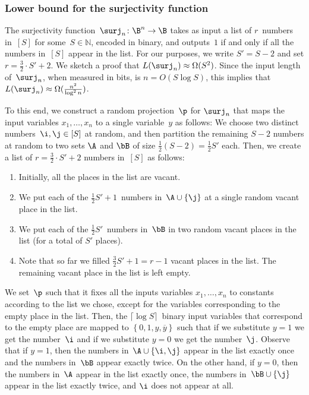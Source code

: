 \documentclass[11pt]{article}
\numberwithin{equation}{section}
\theoremstyle{definition}
\theoremstyle{plain}
\newcommand{\N}{\mathbb N}
\theoremstyle{definition}\newtheorem{notation}[theorem]{Notation}\theoremstyle{plain}
\begin{document}
\subsubsection{Lower bound for the surjectivity function}

The surjectivity function~$\surj_{n}\colon\B^{n}\to\B$ \cite{BM12} takes
as input a list of $r$~numbers in~$\left[S\right]$ for some~$S\in\N$,
encoded in binary, and outputs~$1$ if and only if all the numbers
in~$\left[S\right]$ appear in the list. For our purposes, we 
%
write %
$S'=S-2$ and set $r=\frac{3}{2}\cdot S'+2$. We sketch a proof that
$L(\surj_{n})\approx\Omega(S^{2})$. Since the input length of~$\surj_{n}$,
%
when measured in bits, is $n=O(S\log S)$, this implies that $L(\surj_{n})\approx\Omega(\frac{n^{2}}{\log^{2}n})$.

To this end, we construct a random projection~$\p$ for $\surj_{n}$
that maps the input variables $x_{1},\ldots,x_{n}$ to a single variable~$y$
as follows: We choose two distinct numbers~$\i,\j\in\left[S\right]$ at random,
and then partition the remaining $S-2$ numbers at random to two sets
$\A$ and $\bB$ of size $\frac{1}{2}(S-2)=\frac{1}{2}S'$ each. Then,
we create a list of $r=\frac{3}{2}\cdot S'+2$ numbers in~$\left[S\right]$
as follows:
\begin{enumerate}
\item Initially, all the places in the list are vacant.

\item We put each of the $\frac{1}{2}S'+1$~numbers in~$\A\cup\left\{ \j\right\} $
at a single random vacant place in the list.
\item We put each of the $\frac{1}{2}S'$~numbers in~$\bB$ in two random vacant
places in the list (for a total of $S'$ places).
\item Note that so far we filled $\frac{3}{2}S'+1=r-1$ vacant places in the list.
The remaining vacant place in the list is left empty.
\end{enumerate}
We set~$\p$ such that it fixes all the inputs variables $x_{1},\ldots,x_{n}$
to constants according to the list we chose, except for the variables
corresponding to the empty place in the list. Then, the $\lceil \log S \rceil$~binary input variables
that correspond to the empty place are mapped to $\left\{ 0,1,y,\overline{y}\right\} $
such that if we substitute $y=1$ we get the number~$\i$ and if
we substitute $y=0$ we get the number~$\j$. Observe that if $y=1$,
then the numbers in~$\A\cup\left\{ \i,\j\right\} $ appear in the
list exactly once and the numbers in~$\bB$ appear exactly twice.
On the other hand, if $y=0$, then the numbers in~$\A$ appear in
the list exactly once, the numbers in~$\bB\cup\left\{ \j\right\} $
appear in the list exactly twice, and $\i$ does not appear at all.
\end{document}
